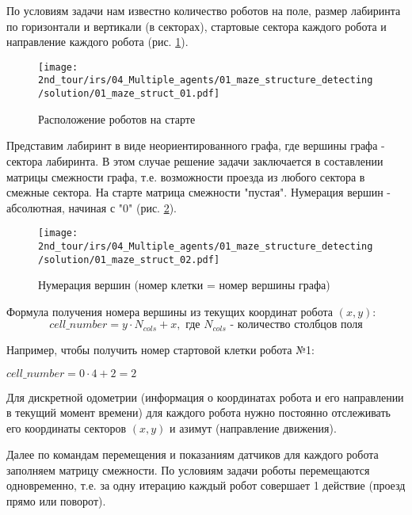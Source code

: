 \solutionSection

По условиям задачи нам известно количество роботов на поле, размер лабиринта по горизонтали и вертикали (в секторах), стартовые сектора каждого робота и направление каждого робота (рис. \ref{fig:01_maze_struct_01}).

\begin{figure}[h!]
	\centering
	\texttt{[image: 2nd\_tour/irs/04\_Multiple\_agents/01\_maze\_structure\_detecting/solution/01\_maze\_struct\_01.pdf]}
	\caption{Расположение роботов на старте}
	\label{fig:01_maze_struct_01}
\end{figure}

Представим лабиринт в виде неориентированного графа, где вершины графа - сектора лабиринта. В этом случае решение задачи заключается в составлении матрицы смежности графа, т.е. возможности проезда из любого сектора в смежные сектора. На старте матрица смежности "пустая". Нумерация вершин - абсолютная, начиная с "$0$" (рис. \ref{fig:01_maze_struct_02}).

\begin{figure}[h!]
	\centering
	\texttt{[image: 2nd\_tour/irs/04\_Multiple\_agents/01\_maze\_structure\_detecting/solution/01\_maze\_struct\_02.pdf]}
	\caption{Нумерация вершин (номер клетки = номер вершины графа)}
	\label{fig:01_maze_struct_02}
\end{figure}

Формула получения номера вершины из текущих координат робота $(x, y)$:
\begin{equation*}
cell\_number = y \cdot N_{cols} + x, \text{ где } N_{cols} \text{ - количество столбцов поля}
\end{equation*}

Например, чтобы получить номер стартовой клетки робота №1:
\begin{center}
	$cell\_number = 0 \cdot 4 + 2 = 2$
\end{center}

Для дискретной одометрии (информация о координатах робота и его направлении в текущий момент времени) для каждого робота нужно постоянно отслеживать его координаты секторов $(x, y)$ и азимут (направление движения).

Далее по командам перемещения и показаниям датчиков для каждого робота заполняем матрицу смежности. По условиям задачи роботы перемещаются одновременно, т.е. за одну итерацию каждый робот совершает 1 действие (проезд прямо или поворот). 
\\

